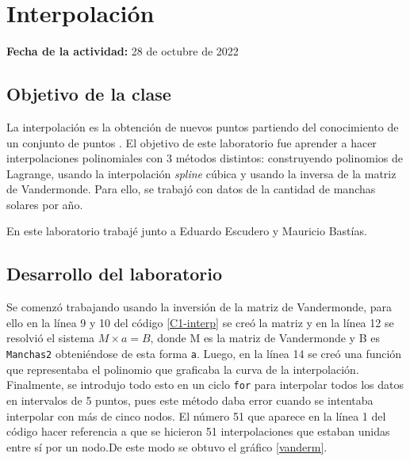 \documentclass[../portafolio.tex]{subfiles}
\begin{document}
\section{Interpolación} 

\hfill \textbf{Fecha de la actividad:} 28 de octubre de 2022

\medskip



\subsection{Objetivo de la clase}

La interpolación es la obtención de nuevos puntos partiendo del conocimiento de un conjunto de puntos \cite{interpol}. El objetivo de este laboratorio fue aprender a hacer interpolaciones polinomiales con 3 métodos distintos: construyendo polinomios de Lagrange, usando la interpolación \textit{spline} cúbica y usando la inversa de la matriz de Vandermonde. Para ello, se trabajó con datos de la cantidad de manchas solares por año.

\vspace{2mm}
En este laboratorio trabajé junto a Eduardo Escudero y Mauricio Bastías.




\subsection{Desarrollo del laboratorio}

Se comenzó trabajando usando la inversión de la matriz de Vandermonde, para ello en la línea 9 y 10 del código \ref{C1-interp} se creó la matriz y en la línea 12 se resolvió el sistema $M\times a = B$, donde M es la matriz de Vandermonde y B es \texttt{Manchas2} obteniéndose de esta forma \texttt{a}. Luego, en la línea 14 se creó una función que representaba el polinomio que graficaba la curva de la interpolación. Finalmente, se introdujo todo esto en un ciclo \texttt{for} para interpolar todos los datos en intervalos de 5 puntos, pues este método daba error cuando se intentaba interpolar con más de cinco nodos. El número 51 que aparece en la línea 1 del código hacer referencia a que se hicieron 51 interpolaciones que estaban unidas entre sí por un nodo.De este modo se obtuvo el gráfico \ref{vanderm}.
\end{document}
